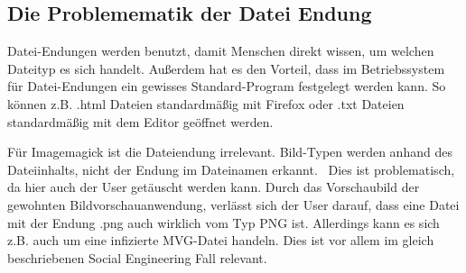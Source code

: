 \newpage
\subsection{Die Problemematik der Datei Endung}\label{subsec:die-problemematik-der-datei-endung}
Datei-Endungen werden benutzt, damit Menschen direkt wissen, um welchen Dateityp es sich handelt.
Außerdem hat es den Vorteil, dass im Betriebssystem für Datei-Endungen ein gewisses Standard-Program festgelegt werden kann.
So können z.B. .html Dateien standardmäßig mit Firefox oder .txt Dateien standardmäßig mit dem Editor geöffnet werden.

Für Imagemagick ist die Dateiendung irrelevant.
Bild-Typen werden anhand des Dateiinhalts, nicht der Endung im Dateinamen erkannt.~\cite{ImageTragick}
Dies ist problematisch, da hier auch der User getäuscht werden kann.
Durch das Vorschaubild der gewohnten Bildvorschauanwendung, verlässt sich der User darauf, dass eine Datei mit der Endung .png auch wirklich vom Typ PNG ist.
Allerdings kann es sich z.B. auch um eine infizierte MVG-Datei handeln.
Dies ist vor allem im gleich beschriebenen Social Engineering Fall relevant.